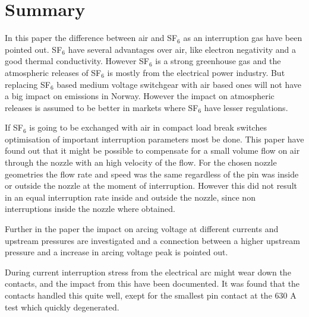 \documentclass[10pt,a4paper,twoside]{article}
\begin{document}
\thispagestyle{empty}
\cleardoublepage

\section*{Summary}
\setcounter{page}{1}

In this paper the difference between air and SF$_6$ as an interruption gas have been pointed out. SF$_6$ have several advantages over air, like electron negativity and a good thermal conductivity. However SF$_6$ is a strong greenhouse gas and the atmospheric releases of SF$_6$ is mostly from the electrical power industry. But replacing SF$_6$ based medium voltage switchgear with air based ones will not have a big impact on emissions in Norway. However the impact on atmospheric releases is assumed to be better in markets where SF$_6$ have lesser regulations.

If SF$_6$ is going to be exchanged with air in compact load break switches optimisation of important interruption parameters most be done. This paper have found out that it might be possible to compensate for a small volume flow on air through the nozzle with an high velocity of the flow. For the chosen nozzle geometries the flow rate and speed was the same regardless of the pin was inside or outside the nozzle at the moment of interruption. However this did not result in an equal interruption rate inside and outside the nozzle, since non interruptions inside the nozzle where obtained.

Further in the paper the impact on arcing voltage at different currents and upstream pressures are investigated and a connection between a higher upstream pressure and a increase in arcing voltage peak is pointed out.

During current interruption stress from the electrical arc might wear down the contacts, and the impact from this have been documented. It was found that the contacts handled this quite well, exept for the smallest pin contact at the 630 A test which quickly degenerated.

\cleardoublepage
\setcounter{page}{1}
\tableofcontents
\cleardoublepage
\end{document}
